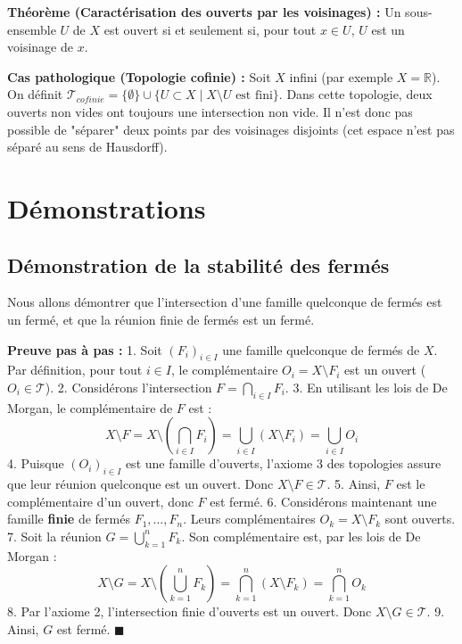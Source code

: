 \documentclass[11pt,a4paper]{article}
\begin{document}
\textbf{Théorème (Caractérisation des ouverts par les voisinages) :}
Un sous-ensemble $U$ de $X$ est ouvert si et seulement si, pour tout $x \in U$, $U$ est un voisinage de $x$.

\textbf{Cas pathologique (Topologie cofinie) :}
Soit $X$ infini (par exemple $X = \mathbb{R}$). On définit $\mathcal{T}_{cofinie} = \{\emptyset\} \cup \{U \subset X \mid X \setminus U \text{ est fini}\}$. Dans cette topologie, deux ouverts non vides ont toujours une intersection non vide. Il n'est donc pas possible de "séparer" deux points par des voisinages disjoints (cet espace n'est pas séparé au sens de Hausdorff).

\section{Démonstrations}

\subsection{Démonstration de la stabilité des fermés}

Nous allons démontrer que l'intersection d'une famille quelconque de fermés est un fermé, et que la réunion finie de fermés est un fermé.

\textbf{Preuve pas à pas :}
1. Soit $(F_i)_{i \in I}$ une famille quelconque de fermés de $X$. Par définition, pour tout $i \in I$, le complémentaire $O_i = X \setminus F_i$ est un ouvert ($O_i \in \mathcal{T}$).
2. Considérons l'intersection $F = \bigcap_{i \in I} F_i$.
3. En utilisant les lois de De Morgan, le complémentaire de $F$ est :
   $$ X \setminus F = X \setminus \left( \bigcap_{i \in I} F_i \right) = \bigcup_{i \in I} (X \setminus F_i) = \bigcup_{i \in I} O_i $$
4. Puisque $(O_i)_{i \in I}$ est une famille d'ouverts, l'axiome 3 des topologies assure que leur réunion quelconque est un ouvert. Donc $X \setminus F \in \mathcal{T}$.
5. Ainsi, $F$ est le complémentaire d'un ouvert, donc $F$ est fermé.
6. Considérons maintenant une famille \textbf{finie} de fermés $F_1, \dots, F_n$. Leurs complémentaires $O_k = X \setminus F_k$ sont ouverts.
7. Soit la réunion $G = \bigcup_{k=1}^n F_k$. Son complémentaire est, par les lois de De Morgan :
   $$ X \setminus G = X \setminus \left( \bigcup_{k=1}^n F_k \right) = \bigcap_{k=1}^n (X \setminus F_k) = \bigcap_{k=1}^n O_k $$
8. Par l'axiome 2, l'intersection finie d'ouverts est un ouvert. Donc $X \setminus G \in \mathcal{T}$.
9. Ainsi, $G$ est fermé. $\blacksquare$
\end{document}
